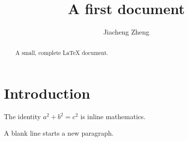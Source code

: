 \documentclass[11pt]{article}
\begin{document}
\title{A first document}
\author{Jiacheng Zheng}
\date{}
\maketitle
\begin{abstract}A small, complete LaTeX document.\end{abstract}
\section{Introduction}
The identity $a^2+b^2=c^2$ is inline mathematics.

A blank line starts a new paragraph.
\end{document}
